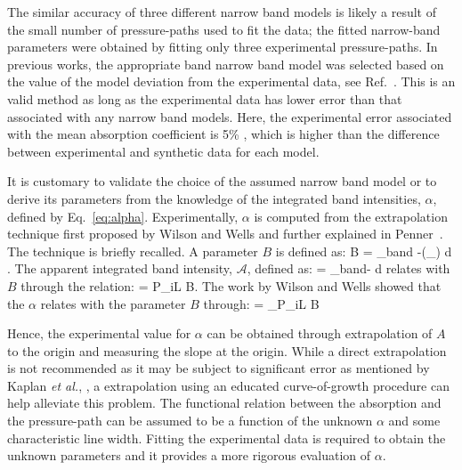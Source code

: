 The similar accuracy of three different narrow band models is likely a result of the small number of pressure-paths used to fit the data;  the fitted narrow-band parameters were obtained by fitting only three experimental pressure-paths. In previous works, the appropriate band narrow band model was selected based on the value of the model deviation from the experimental data, see Ref.~\cite{Kunitomo1975}. This is an valid method as long as the experimental data has lower error than that associated with any narrow band models. Here, the experimental error associated with the mean absorption coefficient is 5\% \cite{Wakatsuki2008}, which is higher than the difference between experimental and synthetic data for each model.

It is customary to validate the choice of the assumed narrow band model or to derive its parameters from the knowledge of the integrated band intensities, $\alpha$, defined by Eq.~\ref{eq:alpha}. Experimentally, $\alpha$ is computed from the extrapolation technique first proposed by Wilson and Wells \cite{Wilson1946,Thorndike1947} and further explained in Penner~\cite{Penner1959}. The technique is briefly recalled. A parameter $B$ is defined as:
\be
 B =  \displaystyle\int\limits_{band} -\ln(\tau_{\omega}) {\rm d} \omega.
\ee
The apparent integrated band intensity, $\mathcal{A}$, defined as:
\be
  = \displaystyle\int\limits_{band}{-\ln{\tau_{\omega}}} {\rm d} \omega
\ee
relates with $B$ through the relation:
\be
\label{eq:LineofGrowth}
 = P_iL B.
\ee
The work by Wilson and Wells \cite{Wilson1946,Thorndike1947} showed that the $\alpha$ relates with the parameter $B$ through:
\be
\label{eq:Exp_alpha}
 \alpha = \lim\limits_{P_iL} B
\ee

Hence, the experimental value for $\alpha$ can be obtained through extrapolation of $A$ to the origin and
measuring the slope at the origin. While a direct extrapolation is not recommended as it may be subject to significant error as mentioned by Kaplan \textit{et al.}, \cite{Kaplan1956a}, a extrapolation using an educated curve-of-growth procedure \cite{Kaplan1956a} can help alleviate this problem. The functional relation between the absorption and the pressure-path can be assumed to be a function of the unknown $\alpha$ and some characteristic line width. Fitting the experimental data is required to obtain the unknown parameters and it provides a more rigorous evaluation of $\alpha$.


